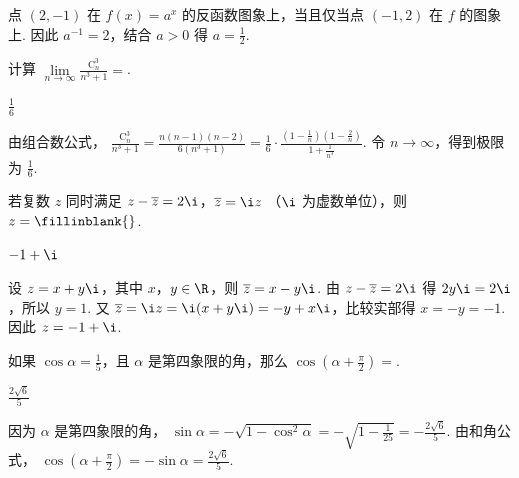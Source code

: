 \begin{solution}
点 \((2,-1)\) 在 \(f(x)=a^x\) 的反函数图象上，当且仅当点 \((-1,2)\) 在 \(f\) 的图象上. 因此 \(a^{-1}=2\)，结合 \(a>0\) 得 \(a=\frac{1}{2}\).
\end{solution}

\begin{problem}
计算 \(\lim\limits_{n\to \infty}\frac{\mathrm C_n^3}{n^3 + 1} =\)\fillinblank{}.
\end{problem}

\begin{answer}
\(\frac{1}{6}\)
\end{answer}

\begin{solution}
由组合数公式，
\(\displaystyle \frac{\mathrm C_n^3}{n^3+1}=\frac{n(n-1)(n-2)}{6(n^3+1)}=\frac{1}{6}\cdot\frac{\left(1-\frac{1}{n}\right)\left(1-\frac{2}{n}\right)}{1+\frac{1}{n^3}}\). 令 \(n\to\infty\)，得到极限为 \(\frac{1}{6}\).
\end{solution}

\begin{problem}
若复数 \(z\) 同时满足 \(z - \overline{z} = 2\i\)，\(\overline{z} = \i z\) （\(\i\) 为虚数单位），则 \(z =\fillinblank{}\).
\end{problem}

\begin{answer}
\(-1+\i\)
\end{answer}

\begin{solution}
设 \(z=x+y\i\)，其中 \(x\)，\(y\in\R\)，则 \(\overline z=x-y\i\). 由 \(z-\overline z=2\i\) 得 \(2y\i=2\i\)，所以 \(y=1\). 又
\(\overline z=\i z=\i(x+y\i)=-y+x\i\)，比较实部得 \(x=-y=-1\). 因此 \(z=-1+\i\).
\end{solution}

\begin{problem}
如果 \(\cos \alpha = \frac{1}{5}\)，且 \(\alpha\) 是第四象限的角，那么 \(\cos \left(\alpha + \frac{\pi}{2}\right) =\)\fillinblank{}.
\end{problem}

\begin{answer}
\(\frac{2\sqrt{6}}{5}\)
\end{answer}

\begin{solution}
因为 \(\alpha\) 是第四象限的角，
\(\sin\alpha=-\sqrt{1-\cos^2\alpha}=-\sqrt{1-\frac{1}{25}}=-\frac{2\sqrt{6}}{5}\). 由和角公式，
\(\cos\left(\alpha+\frac{\pi}{2}\right)=-\sin\alpha=\frac{2\sqrt{6}}{5}\).
\end{solution}

